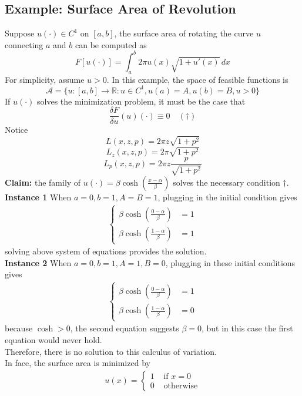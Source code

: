 \documentclass[11pt]{article}
\newcommand{\tb}[1]{\textbf{#1}}
\newcommand{\mc}[1]{\mathcal{#1}}
\newcommand{\real}[0]{\mathbb{R}}
\begin{document}
\subsection{Example: Surface Area of Revolution}
Suppose $u(\cdot) \in C^1$ on $[a,b]$, the surface area of rotating the curve $u$ connecting $a$ and $b$ can be computed as
$$F[u(\cdot)] = \int_a^b 2\pi u(x) \sqrt{1 + u'(x)} \, dx$$
For simplicity, assume $u > 0$. 
In this example, the space of feasible functions is
$$ \mc{A} = \{ u:[a,b] \rightarrow \real: u \in C^1, u(a) = A, u(b) = B, u > 0 \}$$
If $u(\cdot)$ solves the minimization problem, it must be the case that
$$\frac{\delta F}{\delta u}(u)(\cdot) \equiv 0 \quad (\dagger)$$
Notice
$$L(x,z,p) = 2\pi z \sqrt{1 + p^2}$$
$$L_z(x,z,p) = 2\pi \sqrt{1 + p^2}$$
$$L_p(x,z,p) = 2\pi z \frac{p}{\sqrt{1 + p^2}}$$
\tb{Claim: } the family of $u(\cdot) = \beta \cosh(\frac{x - \alpha}{\beta})$ solves the necessary condition $\dagger$. \\
\textbf{Instance 1} When $a=0, b=1, A=B=1$, plugging in the initial condition gives
		\begin{align}
			\begin{cases}
				\beta \cosh \left(\frac{0-\alpha}{\beta}\right) &= 1 \\
				\beta \cosh \left(\frac{1-\alpha}{\beta}\right) &= 1
			\end{cases}
		\end{align}
		solving above system of equations provides the solution. \\
		\textbf{Instance 2} When $a=0, b=1, A=1, B=0$, plugging in these initial conditions gives
		\begin{align}
			\begin{cases}
				\beta \cosh \left(\frac{0-\alpha}{\beta}\right) &= 1 \\
				\beta \cosh \left(\frac{1-\alpha}{\beta}\right) &= 0
			\end{cases}
		\end{align}
		because $\cosh > 0$, the second equation suggests $\beta=0$, but in this case the first equation would never hold. \\
		Therefore, there is no solution to this calculus of variation. \\
		In face, the surface area is minimized by
		\begin{align}
			u(x) = \begin{cases}
				1 &\text{ if } x = 0 \\
				0 &\text{ otherwise}
			\end{cases}
		\end{align}
\end{document}
